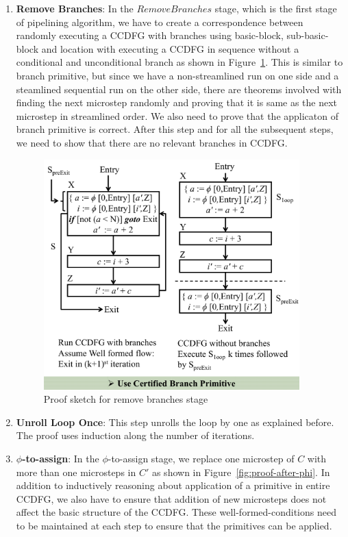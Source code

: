 \begin{enumerate}
\item \textbf{Remove Branches}: In the $Remove Branches$ stage, which is the first stage of pipelining algorithm, we have to create a correspondence between randomly executing a CCDFG with branches using basic-block, sub-basic-block and location with executing a CCDFG in sequence without a conditional and unconditional branch as shown in Figure~\ref{fig:proof-remove-branches}. This is similar to branch primitive, but since we have a non-streamlined run on one side and a steamlined sequential run on the other side, there are theorems involved with finding the next microstep randomly and proving that it is same as the next microstep in streamlined order. We also need to prove that the applicaton of branch primitive is correct. After this step and for all the subsequent steps, we need to show that there are no relevant branches in CCDFG.
                                             
\begin{figure}[t!]
\begin{center}
\includegraphics[height=3.5in]{fig-proposal/proof-remove-branches}
\end{center}
\caption{Proof sketch for remove branches stage}
\label{fig:proof-remove-branches}
\end{figure}

\item \textbf{Unroll Loop Once}: This step unrolls the loop by one as explained before. The proof uses induction along the number of iterations.

\item \textbf{$\phi$-to-assign}: In the $\phi$-to-assign stage, we replace one microstep of $C$ with more than one microsteps in $C'$
as shown in Figure~\ref{fig:proof-after-phi}. 
In addition to inductively reasoning about application of a primitive in entire CCDFG, we also have to ensure
that addition of new microsteps does not affect the basic structure of the CCDFG. These well-formed-conditions need to be maintained at each step to ensure that the primitives can be applied.




\end{enumerate}
